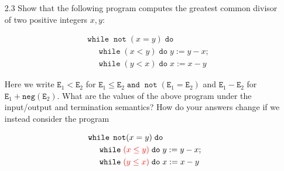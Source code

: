 \documentclass{article}
\newcommand{\E}{\mathtt{E}}
\newcommand{\andsym}{\mathtt{and}}
\newcommand{\notsym}{\mathop{\mathtt{not}}}
\newcommand{\whilesym}{\mathtt{while}}
\newcommand{\dosym}{\mathtt{do}}
\newcommand{\negation}{\mathtt{neg}}
\newcommand{\question}[1]
{\color{DarkBlue}#1 \color{Black}}
\begin{document}
\begin{enumerate}
\begin{enumerate}
\end{enumerate}


\question{
\item[2.3] Show that the following program computes the greatest common divisor of two positive integers $x,y$:

\begin{align*}
& \whilesym \; \notsym(x = y) \; \dosym \\
& \;\;\;\;\; \whilesym \; (x < y) \; \dosym \; y := y - x; \\
& \;\;\;\;\; \whilesym \; (y < x) \; \dosym \; x := x - y
\end{align*}

Here we write $\E_1 < \E_2$ for $\E_1 \leq \E_2 \; \andsym \; \notsym(\E_1 = \E_2)$ and $\E_1 - \E_2$ for $\E_1 + \negation(\E_2)$. 
What are the values of the above program under the input/output and termination semantics? 
How do your answers change if we instead consider the program

\begin{align*}
& \whilesym \; \notsym(x = y) \; \dosym \\
& \;\;\;\;\; \whilesym \; {\color{red} (x \leq y)} \; \dosym \; y := y - x; \\
& \;\;\;\;\; \whilesym \; {\color{red} (y \leq x)} \; \dosym \; x := x - y
\end{align*}
}

\end{enumerate}
\end{document}

